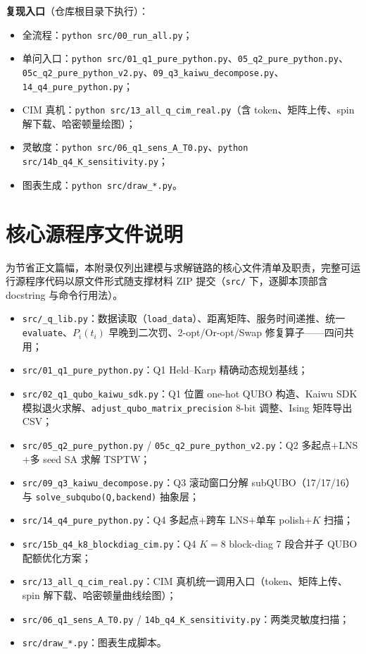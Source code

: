 \documentclass[UTF8,12pt,a4paper]{ctexart}
\begin{document}
\textbf{复现入口}（仓库根目录下执行）：
\begin{itemize}
  \item 全流程：\texttt{python src/00\_run\_all.py}；
  \item 单问入口：\texttt{python src/01\_q1\_pure\_python.py}、\texttt{05\_q2\_pure\_python.py}、\texttt{05c\_q2\_pure\_python\_v2.py}、\texttt{09\_q3\_kaiwu\_decompose.py}、\texttt{14\_q4\_pure\_python.py}；
  \item CIM 真机：\texttt{python src/13\_all\_q\_cim\_real.py}（含 token、矩阵上传、spin 解下载、哈密顿量绘图）；
  \item 灵敏度：\texttt{python src/06\_q1\_sens\_A\_T0.py}、\texttt{python src/14b\_q4\_K\_sensitivity.py}；
  \item 图表生成：\texttt{python src/draw\_*.py}。
\end{itemize}

\section{核心源程序文件说明}
\label{app:src}

为节省正文篇幅，本附录仅列出建模与求解链路的核心文件清单及职责，完整可运行源程序代码以原文件形式随支撑材料 ZIP 提交（\texttt{src/} 下，逐脚本顶部含 docstring 与命令行用法）。

\begin{itemize}
  \item \texttt{src/\_q\_lib.py}：数据读取（\texttt{load\_data}）、距离矩阵、服务时间递推、统一 \texttt{evaluate}、$P_i(t_i)$ 早晚到二次罚、2-opt/Or-opt/Swap 修复算子——四问共用；
  \item \texttt{src/01\_q1\_pure\_python.py}：Q1 Held--Karp 精确动态规划基线；
  \item \texttt{src/02\_q1\_qubo\_kaiwu\_sdk.py}：Q1 位置 one-hot QUBO 构造、Kaiwu SDK 模拟退火求解、\texttt{adjust\_qubo\_matrix\_precision} 8-bit 调整、Ising 矩阵导出 CSV；
  \item \texttt{src/05\_q2\_pure\_python.py} / \texttt{05c\_q2\_pure\_python\_v2.py}：Q2 多起点$+$LNS$+$多 seed SA 求解 TSPTW；
  \item \texttt{src/09\_q3\_kaiwu\_decompose.py}：Q3 滚动窗口分解 subQUBO（17/17/16）与 \texttt{solve\_subqubo(Q,backend)} 抽象层；
  \item \texttt{src/14\_q4\_pure\_python.py}：Q4 多起点$+$跨车 LNS$+$单车 polish$+K$ 扫描；
  \item \texttt{src/15b\_q4\_k8\_blockdiag\_cim.py}：Q4 $K=8$ block-diag 7 段合并子 QUBO 配额优化方案；
  \item \texttt{src/13\_all\_q\_cim\_real.py}：CIM 真机统一调用入口（token、矩阵上传、spin 解下载、哈密顿量曲线绘图）；
  \item \texttt{src/06\_q1\_sens\_A\_T0.py} / \texttt{14b\_q4\_K\_sensitivity.py}：两类灵敏度扫描；
  \item \texttt{src/draw\_*.py}：图表生成脚本。
\end{itemize}
\end{document}
